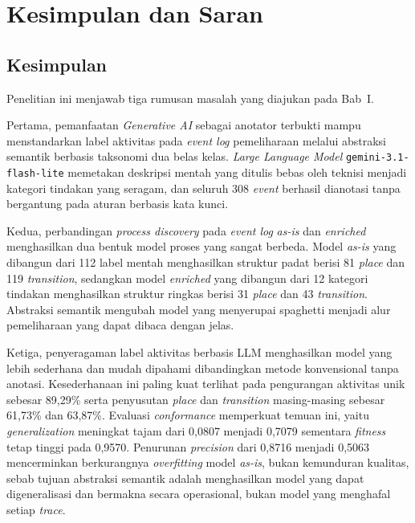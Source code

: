 \chapter{Kesimpulan dan Saran}

\section{Kesimpulan}

Penelitian ini menjawab tiga rumusan masalah yang diajukan pada Bab~I.

Pertama, pemanfaatan \textit{Generative AI} sebagai anotator terbukti mampu menstandarkan label aktivitas pada \textit{event log} pemeliharaan melalui abstraksi semantik berbasis taksonomi dua belas kelas. \textit{Large Language Model} \texttt{gemini-3.1-flash-lite} memetakan deskripsi mentah yang ditulis bebas oleh teknisi menjadi kategori tindakan yang seragam, dan seluruh 308 \textit{event} berhasil dianotasi tanpa bergantung pada aturan berbasis kata kunci.

Kedua, perbandingan \textit{process discovery} pada \textit{event log} \textit{as-is} dan \textit{enriched} menghasilkan dua bentuk model proses yang sangat berbeda. Model \textit{as-is} yang dibangun dari 112 label mentah menghasilkan struktur padat berisi 81 \textit{place} dan 119 \textit{transition}, sedangkan model \textit{enriched} yang dibangun dari 12 kategori tindakan menghasilkan struktur ringkas berisi 31 \textit{place} dan 43 \textit{transition}. Abstraksi semantik mengubah model yang menyerupai spaghetti menjadi alur pemeliharaan yang dapat dibaca dengan jelas.

Ketiga, penyeragaman label aktivitas berbasis LLM menghasilkan model yang lebih sederhana dan mudah dipahami dibandingkan metode konvensional tanpa anotasi. Kesederhanaan ini paling kuat terlihat pada pengurangan aktivitas unik sebesar 89,29\% serta penyusutan \textit{place} dan \textit{transition} masing-masing sebesar 61,73\% dan 63,87\%. Evaluasi \textit{conformance} memperkuat temuan ini, yaitu \textit{generalization} meningkat tajam dari 0,0807 menjadi 0,7079 sementara \textit{fitness} tetap tinggi pada 0,9570. Penurunan \textit{precision} dari 0,8716 menjadi 0,5063 mencerminkan berkurangnya \textit{overfitting} model \textit{as-is}, bukan kemunduran kualitas, sebab tujuan abstraksi semantik adalah menghasilkan model yang dapat digeneralisasi dan bermakna secara operasional, bukan model yang menghafal setiap \textit{trace}.

